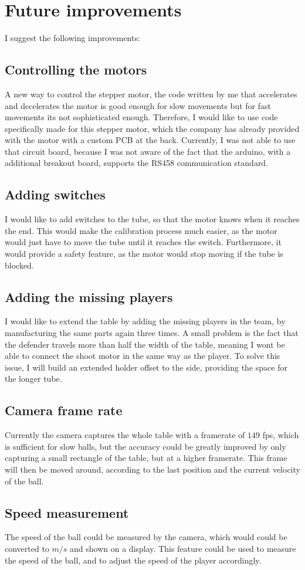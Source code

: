 \section{Future improvements}\label{sec:improvements}
I suggest the following improvements:
\subsection*{Controlling the motors}
A new way to control the stepper motor, the code written by me that accelerates and decelerates the motor is good enough for slow movements but for fast movements its not sophisticated enough.
Therefore, I would like to use code specifically made for this stepper motor, which the company has already provided with the motor with a custom PCB at the back.
Currently, I was not able to use that circuit board, because I was not aware of the fact that the arduino, with a additional breakout board, supports the RS458 communication standard.
\subsection*{Adding switches}
I would like to add switches to the tube, so that the motor knows when it reaches the end.
This would make the calibration process much easier, as the motor would just have to move the tube until it reaches the switch.
Furthermore, it would provide a safety feature, as the motor would stop moving if the tube is blocked.
\subsection*{Adding the missing players}
I would like to extend the table by adding the missing players in the team, by manufacturing the same parts again three times.
A small problem is the fact that the defender travels more than half the width of the table, meaning I wont be able to connect the shoot motor in the same way as the player.
To solve this issue, I will build an extended holder offset to the side, providing the space for the longer tube.
\subsection*{Camera frame rate}
Currently the camera captures the whole table with a framerate of $149$ fps, which is sufficient for slow balls, but the accuracy could be greatly improved by only capturing a small rectangle of the table, but at a higher framerate.
This frame will then be moved around, according to the last position and the current velocity of the ball.
\subsection*{Speed measurement}
The speed of the ball could be measured by the camera, which would could be converted to $m/s$ and shown on a display.
This feature could be used to measure the speed of the ball, and to adjust the speed of the player accordingly.

